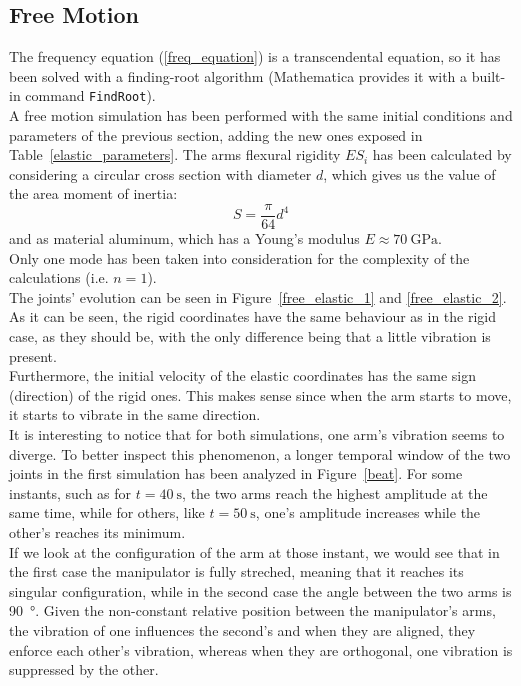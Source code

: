 \documentclass[a4paper,12pt,oneside]{report}
\begin{document}
\subsection{Free Motion}
The frequency equation (\ref{freq_equation}) is a transcendental equation, so it has been solved with a finding-root algorithm (Mathematica provides it with a built-in command \texttt{FindRoot}).\\
A free motion simulation has been performed with the same initial conditions and parameters of the previous section, adding the new ones exposed in Table~\ref{elastic_parameters}. The arms flexural rigidity $ES_i$ has been calculated by considering a circular cross section with diameter $d$, which gives us the value of the area moment of inertia:
\begin{equation}
  S=\frac{\pi}{64}d^4
\end{equation}
and as material aluminum, which has a Young's modulus $E\approx \SI{70}{\giga\pascal}$.\\
Only one mode has been taken into consideration for the complexity of the calculations (i.e. $n=1$).\\
The joints' evolution can be seen in Figure~\ref{free_elastic_1} and \ref{free_elastic_2}.\\
As it can be seen, the rigid coordinates have the same behaviour as in the rigid case, as they should be, with the only difference being that a little vibration is present.\\
Furthermore, the initial velocity of the elastic coordinates has the same sign (direction) of the rigid ones. This makes sense since when the arm starts to move, it starts to vibrate in the same direction.\\
It is interesting to notice that for both simulations, one arm's vibration seems to diverge. To better inspect this phenomenon, a longer temporal window of the two joints in the first simulation has been analyzed in Figure~\ref{beat}. For some instants, such as for $t=\SI{40}{\second}$, the two arms reach the highest amplitude at the same time, while for others, like $t=\SI{50}{\second}$, one's amplitude increases while the other's reaches its minimum.\\
If we look at the configuration of the arm at those instant, we would see that in the first case the manipulator is fully streched, meaning that it reaches its singular configuration, while in the second case the angle between the two arms is \SI{90}{\degree}. Given the non-constant relative position between the manipulator's arms, the vibration of one influences the second's and when they are aligned, they enforce each other's vibration, whereas when they are orthogonal, one vibration is suppressed by the other.
\end{document}
